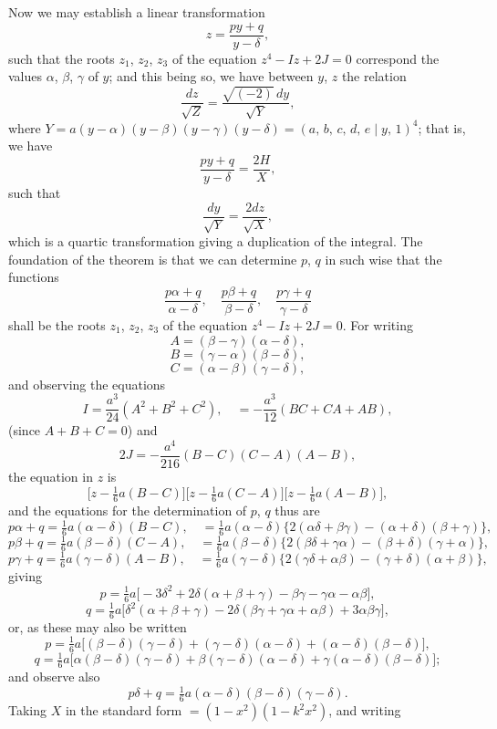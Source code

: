 \documentclass[11pt]{article}
\begin{document}
Now we may establish a linear transformation
\[
z = \frac{py + q}{y - \delta},
\]
such that the roots $z_{1}$, $z_{2}$, $z_{3}$ of the equation $z^{4} - Iz + 2J = 0$ correspond the values $\alpha$, $\beta$, $\gamma$ of $y$; and this being so, we have between $y$, $z$ the relation
\[
\frac{dz}{\sqrt{Z}} = \frac{\sqrt{(-2)}\,dy}{\sqrt{Y}},
\]
where $Y = a(y-\alpha)(y-\beta)(y-\gamma)(y-\delta) = (a,\,b,\,c,\,d,\,e\mid y,\,1)^{4}$; that is, we have
\[
\frac{py+q}{y-\delta} = \frac{2H}{X},
\]
such that
\[
\frac{dy}{\sqrt{Y}} = \frac{2 dz}{\sqrt{X}},
\]
which is a quartic transformation giving a duplication of the integral. The foundation of the theorem is that we can determine $p$, $q$ in such wise that the functions
\[
\frac{p\alpha+q}{\alpha-\delta},\quad \frac{p\beta+q}{\beta-\delta},\quad \frac{p\gamma+q}{\gamma-\delta}
\]
shall be the roots $z_{1}$, $z_{2}$, $z_{3}$ of the equation $z^{4} - Iz + 2J = 0$. For writing
\[
A = (\beta-\gamma)(\alpha-\delta),
\]
\[
B = (\gamma-\alpha)(\beta-\delta),
\]
\[
C = (\alpha-\beta)(\gamma-\delta),
\]
and observing the equations
\[
I = \frac{a^{3}}{24}(A^{2} + B^{2} + C^{2}),\quad = -\frac{a^{3}}{12}(BC + CA + AB),
\]
(since $A + B + C = 0$) and
\[
2J = -\frac{a^{4}}{216}(B-C)(C-A)(A-B),
\]
the equation in $z$ is
\[
\bigl[z - \tfrac{1}{6}a(B-C)\bigr]\bigl[z - \tfrac{1}{6}a(C-A)\bigr]\bigl[z - \tfrac{1}{6}a(A-B)\bigr],
\]
and the equations for the determination of $p$, $q$ thus are
\[
p\alpha + q = \tfrac{1}{6}a(\alpha-\delta)(B-C),\quad = \tfrac{1}{6}a(\alpha-\delta)\{2(\alpha\delta+\beta\gamma) - (\alpha+\delta)(\beta+\gamma)\},
\]
\[
p\beta + q = \tfrac{1}{6}a(\beta-\delta)(C-A),\quad = \tfrac{1}{6}a(\beta-\delta)\{2(\beta\delta+\gamma\alpha) - (\beta+\delta)(\gamma+\alpha)\},
\]
\[
p\gamma + q = \tfrac{1}{6}a(\gamma-\delta)(A-B),\quad = \tfrac{1}{6}a(\gamma-\delta)\{2(\gamma\delta+\alpha\beta) - (\gamma+\delta)(\alpha+\beta)\},
\]
giving
\[
p = \tfrac{1}{6}a\bigl[-3\delta^{2} + 2\delta(\alpha+\beta+\gamma) - \beta\gamma - \gamma\alpha - \alpha\beta\bigr],
\]
\[
q = \tfrac{1}{6}a\bigl[\delta^{2}(\alpha+\beta+\gamma) - 2\delta(\beta\gamma+\gamma\alpha+\alpha\beta) + 3\alpha\beta\gamma\bigr],
\]
or, as these may also be written
\[
p = \tfrac{1}{6}a\bigl[(\beta-\delta)(\gamma-\delta) + (\gamma-\delta)(\alpha-\delta) + (\alpha-\delta)(\beta-\delta)\bigr],
\]
\[
q = \tfrac{1}{6}a\bigl[\alpha(\beta-\delta)(\gamma-\delta) + \beta(\gamma-\delta)(\alpha-\delta) + \gamma(\alpha-\delta)(\beta-\delta)\bigr];
\]
and observe also
\[
p\delta + q = \tfrac{1}{6}a(\alpha-\delta)(\beta-\delta)(\gamma-\delta).
\]
Taking $X$ in the standard form $= (1-x^{2})(1-k^{2}x^{2})$, and writing
\end{document}
